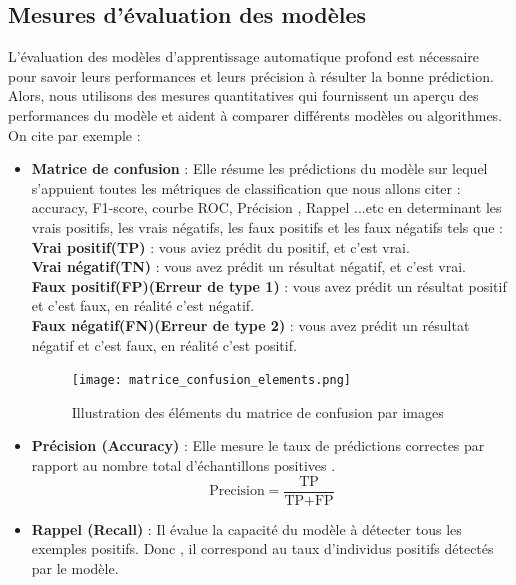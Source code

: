 \subsection{Mesures d'évaluation des modèles}
L’évaluation des modèles d’apprentissage automatique profond est nécessaire pour savoir leurs performances et leurs précision à résulter la bonne prédiction. Alors,  nous utilisons des mesures quantitatives  qui fournissent un aperçu des performances du modèle et aident à comparer différents modèles ou algorithmes. On cite par exemple \cite{important_model_evaluation_error_metrics} \cite{classification_metrics_matrice_de_confusion} \cite{confusion_matrix_accuracy_recall_precision_false_positive_rate_and_f_scores_explained}:
\begin{itemize}[label=$\bullet$] 
\item \textbf{Matrice de confusion} : Elle résume les prédictions du modèle sur lequel s’appuient toutes les métriques de classification que nous allons citer : accuracy, F1-score, courbe ROC, Précision , Rappel ...etc en determinant les vrais positifs, les vrais négatifs, les faux positifs et les faux négatifs tels que :\\
\textbf{Vrai positif(TP)} : vous aviez prédit du positif, et c’est vrai.\\
\textbf{Vrai négatif(TN)} : vous avez prédit un résultat négatif, et c'est vrai.\\
\textbf{Faux positif(FP)(Erreur de type 1)} : vous avez prédit un résultat positif et c'est faux, en réalité c'est négatif.\\
\textbf{Faux négatif(FN)(Erreur de type 2)} : vous avez prédit un résultat négatif et c'est faux, en réalité c'est positif.\\
    \begin{figure}[htbp]
    \centering
    \texttt{[image: matrice\_confusion\_elements.png]}
    \caption{Illustration des éléments du matrice de confusion par images\cite{confusion_matrix_accuracy_recall_precision_false_positive_rate_and_f_scores_explained}}
    \label{fig:example22}
    \end{figure}
\item \textbf{Précision (Accuracy)} : Elle mesure le taux de prédictions correctes par rapport au nombre total d’échantillons positives .
\begin{equation}
\text{Precision} = \frac{\text{TP}}{\text{TP} + \text{FP}}
\end{equation}
\item \textbf{Rappel (Recall)} : Il évalue la capacité du modèle à détecter tous les exemples positifs. Donc , il correspond au taux d’individus positifs détectés par le modèle.

\end{itemize}
